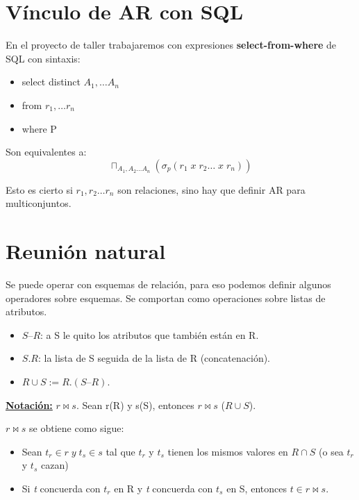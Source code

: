 \documentclass[12pt,a4paper]{report}
\begin{document}
	\section{Vínculo de AR con SQL}
		\par En el proyecto de taller trabajaremos con expresiones \textbf{select-from-where} de SQL con sintaxis:
		\begin{itemize}
			\item select distinct $A_{1}, \dotsc A_{n}$
			\item from $r_{1}, \dotsc r_{n}$
			\item where P
		\end{itemize}

		\par Son equivalentes a:
		\[\sqcap_{A_{1}, A_{2} \dotsc A_{n}}(\sigma_{p}(r_{1} \; x \; r_{2} \dotsc \; x \; r_{n})) \]
		\par Esto es cierto si $r_{1}, r_{2} \dotsc r_{n}$ son relaciones, sino hay que definir AR para multiconjuntos.

	\section{Reunión natural}
		\par Se puede operar con esquemas de relación, para eso podemos definir algunos operadores sobre esquemas. Se comportan como operaciones sobre listas de atributos.
		\begin{itemize}
			\item $S – R$: a S le quito los atributos que también están en R.
			\item $S . R$: la lista de S seguida de la lista de R (concatenación).
			\item $R \cup S := R . (S – R)$.
		\end{itemize}
		\par \underline{\textbf{Notación:}} $r \bowtie s$. Sean r(R) y s(S), entonces $r \bowtie s$ ($R \cup S$).
		\vspace{5mm}		
		\par $r \bowtie s$ se obtiene como sigue:
		\begin{itemize}
			\item Sean $t_{r} \in r \; y \; t_{s} \in s$ tal que $t_{r}$ y $t_{s}$ tienen los mismos valores en $R \cap S$ (o sea $t_{r}$ y $t_{s}$ cazan)
			\item Si \textit{t} concuerda con $t_{r}$ en R y \textit{t} concuerda con $t_{s}$ en S, entonces $t \in r \bowtie s$.
		\end{itemize}
			
\end{document}
